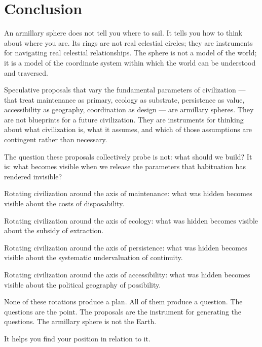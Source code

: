 \documentclass[12pt, a4paper]{article}
\theoremstyle{named}
\begin{document}
\section*{Conclusion}

An armillary sphere does not tell you where to sail. It tells you how
to think about where you are. Its rings are not real celestial circles;
they are instruments for navigating real celestial relationships. The
sphere is not a model of the world; it is a model of the coordinate
system within which the world can be understood and traversed.

Speculative proposals that vary the fundamental parameters of
civilization — that treat maintenance as primary, ecology as substrate,
persistence as value, accessibility as geography, coordination as
design — are armillary spheres. They are not blueprints for a future
civilization. They are instruments for thinking about what civilization
is, what it assumes, and which of those assumptions are contingent
rather than necessary.

The question these proposals collectively probe is not: what should we
build? It is: what becomes visible when we release the parameters that
habituation has rendered invisible?

Rotating civilization around the axis of maintenance: what was hidden
becomes visible about the costs of disposability.

Rotating civilization around the axis of ecology: what was hidden becomes
visible about the subsidy of extraction.

Rotating civilization around the axis of persistence: what was hidden
becomes visible about the systematic undervaluation of continuity.

Rotating civilization around the axis of accessibility: what was hidden
becomes visible about the political geography of possibility.

None of these rotations produce a plan. All of them produce a question.
The questions are the point. The proposals are the instrument for
generating the questions. The armillary sphere is not the Earth.

It helps you find your position in relation to it.
\end{document}
